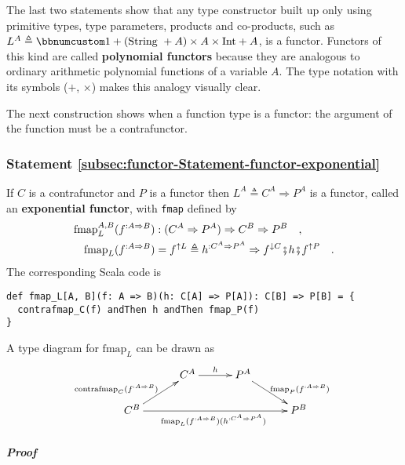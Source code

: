 The last two statements show that any type constructor built up only
using primitive types, type parameters, products and co-products,
such as $L^{A}\triangleq\bbnum 1+(\text{String }+A)\times A\times\text{Int}+A$,
is a functor. Functors of this kind are called \textbf{polynomial
functors} because they are analogous to ordinary arithmetic polynomial
functions of a variable $A$. The type notation with its symbols ($+$,
$\times$) makes this analogy visually clear.

The next construction shows when a function type is a functor: the
argument of the function must be a contrafunctor.

\subsubsection{Statement \label{subsec:functor-Statement-functor-exponential}\ref{subsec:functor-Statement-functor-exponential}}

If $C$ is a contrafunctor and $P$ is a functor then $L^{A}\triangleq C^{A}\Rightarrow P^{A}$
is a functor, called an \textbf{exponential
functor}, with \lstinline!fmap! defined by
\begin{align}
\text{fmap}_{L}^{A,B}(f^{:A\Rightarrow B}) & :(C^{A}\Rightarrow P^{A})\Rightarrow C^{B}\Rightarrow P^{B}\quad,\nonumber \\
\text{fmap}_{L}(f^{:A\Rightarrow B}) & =f^{\uparrow L}\triangleq h^{:C^{A}\Rightarrow P^{A}}\Rightarrow f^{\downarrow C}\bef h\bef f^{\uparrow P}\quad.\label{eq:f-functor-exponential-def-of-fmap}
\end{align}
The corresponding Scala code is
\begin{lstlisting}
def fmap_L[A, B](f: A => B)(h: C[A] => P[A]): C[B] => P[B] = {
  contrafmap_C(f) andThen h andThen fmap_P(f)
}
\end{lstlisting}
A type diagram for $\text{fmap}_{L}$ can be drawn as
\[
\xymatrix{\xyScaleY{1.5pc}\xyScaleX{2.5pc} & C^{A}\ar[r]\sp(0.5){h} & P^{A}\ar[rd]\sp(0.6){\ \text{fmap}_{P}(f^{:A\Rightarrow B})\ }\\
C^{B}\ar[ru]\sp(0.4){\text{contrafmap}_{C}(f^{:A\Rightarrow B})\ ~~}\ar[rrr]\sb(0.5){\text{fmap}_{L}(f^{:A\Rightarrow B})(h^{:C^{A}\Rightarrow P^{A}})\ } &  &  & P^{B}
}
\]


\subparagraph{Proof}

